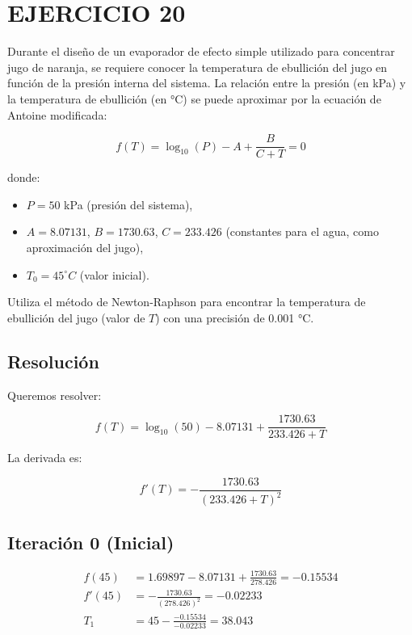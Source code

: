 \documentclass[12pt]{article}
\begin{document}


\section*{EJERCICIO 20}

Durante el diseño de un evaporador de efecto simple utilizado para concentrar jugo de naranja, se requiere conocer la temperatura de ebullición del jugo en función de la presión interna del sistema. La relación entre la presión (en kPa) y la temperatura de ebullición (en °C) se puede aproximar por la ecuación de Antoine modificada:

\[
f(T) = \log_{10}(P) - A + \frac{B}{C + T} = 0
\]

donde:
\begin{itemize}
    \item \( P = 50 \) kPa (presión del sistema),
    \item \( A = 8.07131 \), \( B = 1730.63 \), \( C = 233.426 \) (constantes para el agua, como aproximación del jugo),
    \item \( T_0 = 45^\circ C \) (valor inicial).
\end{itemize}

Utiliza el método de Newton-Raphson para encontrar la temperatura de ebullición del jugo (valor de \( T \)) con una precisión de 0.001 °C.

\subsection*{Resolución }

Queremos resolver:

\[
f(T) = \log_{10}(50) - 8.07131 + \frac{1730.63}{233.426 + T}
\]

La derivada es:

\[
f'(T) = -\frac{1730.63}{(233.426 + T)^2}
\]

\subsection*{Iteración 0 (Inicial)}

\begin{align*}
f(45) &= 1.69897 - 8.07131 + \frac{1730.63}{278.426} = -0.15534 \\
f'(45) &= -\frac{1730.63}{(278.426)^2} = -0.02233 \\
T_1 &= 45 - \frac{-0.15534}{-0.02233} = 38.043
\end{align*}
\end{document}
